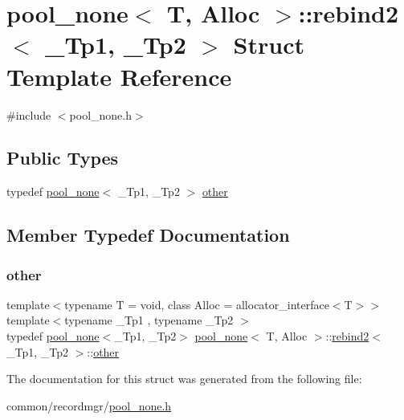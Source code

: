 \hypertarget{structpool__none_1_1rebind2}{}\section{pool\+\_\+none$<$ T, Alloc $>$\+:\+:rebind2$<$ \+\_\+\+Tp1, \+\_\+\+Tp2 $>$ Struct Template Reference}
\label{structpool__none_1_1rebind2}


{\ttfamily \#include $<$pool\+\_\+none.\+h$>$}

\subsection*{Public Types}
\begin{DoxyCompactItemize}
\item 
typedef \hyperlink{classpool__none}{pool\+\_\+none}$<$ \+\_\+\+Tp1, \+\_\+\+Tp2 $>$ \hyperlink{structpool__none_1_1rebind2_a5e4d7c0dd2a8f49bc91cdd9f82a4289a}{other}
\end{DoxyCompactItemize}


\subsection{Member Typedef Documentation}
\mbox{\label{structpool__none_1_1rebind2_a5e4d7c0dd2a8f49bc91cdd9f82a4289a}} 
\subsubsection{\texorpdfstring{other}{other}}
{\footnotesize\ttfamily template$<$typename T  = void, class Alloc  = allocator\+\_\+interface$<$\+T$>$$>$ \\
template$<$typename \+\_\+\+Tp1 , typename \+\_\+\+Tp2 $>$ \\
typedef \hyperlink{classpool__none}{pool\+\_\+none}$<$\+\_\+\+Tp1, \+\_\+\+Tp2$>$ \hyperlink{classpool__none}{pool\+\_\+none}$<$ T, Alloc $>$\+::\hyperlink{structpool__none_1_1rebind2}{rebind2}$<$ \+\_\+\+Tp1, \+\_\+\+Tp2 $>$\+::\hyperlink{structpool__none_1_1rebind2_a5e4d7c0dd2a8f49bc91cdd9f82a4289a}{other}}



The documentation for this struct was generated from the following file\+:\begin{DoxyCompactItemize}
\item 
common/recordmgr/\hyperlink{pool__none_8h}{pool\+\_\+none.\+h}\end{DoxyCompactItemize}
